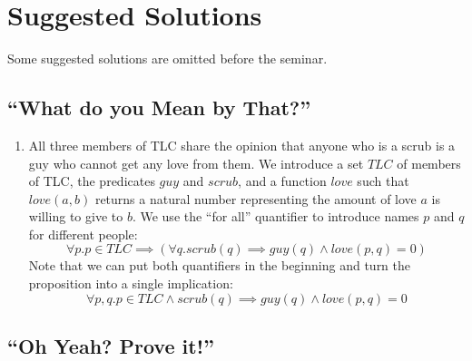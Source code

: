 \documentclass{tufte-handout}
\begin{document}
\section{Suggested Solutions}

Some suggested solutions are omitted before the seminar.

\subsection{``What do you Mean by That?''}

\begin{enumerate}
\item All three members of TLC share the opinion that anyone who
  is a scrub is a guy who cannot get any love from them. We
  introduce a set $\mathit{TLC}$ of members of TLC, the predicates
  $\mathit{guy}$ and $\mathit{scrub}$, and a function
  $\mathit{love}$ such that $\mathit{love}(a, b)$ returns a
  natural number representing the amount of love $a$ is willing to
  give to $b$.
%
  We use the ``for all'' quantifier to introduce names $p$ and $q$
  for different people:
  \[
    \forall p. p \in \mathit{TLC} \implies
    (\forall q. scrub(q) \implies guy(q) \land love(p, q) = 0)
  \]
  Note that we can put both quantifiers in the beginning and turn
  the proposition into a single implication:
  \[
    \forall p, q. p \in \mathit{TLC} \land scrub(q) \implies
    guy(q) \land love(p, q) = 0
  \]
\end{enumerate}

\subsection{``Oh Yeah? Prove it!''}
\end{document}
